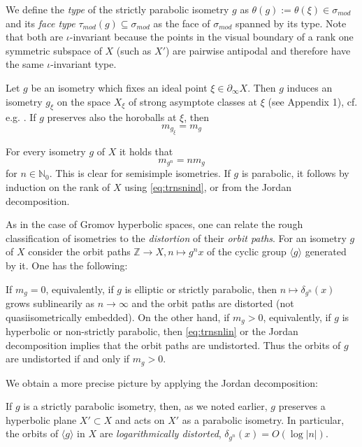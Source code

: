 \documentclass[12pt]{article}
\theoremstyle{boldplain}
\theoremstyle{bolddefinition}
\numberwithin{equation}{section}
\def\N{{\mathbb N}}
\def\Z{{\mathbb Z}}
\def\de{\delta}
\def\si{\sigma}
\def\geo{\partial_{\infty}}
\def\simod{\si_{mod}}
\def\taumod{\tau_{mod}}
\def\<{\langle}
\def\>{\rangle}
\begin{document}
We define the {\em type} of the strictly parabolic isometry $g$ as $\theta(g):=\theta(\xi)\in\simod$
and its {\em face type} $\taumod(g)\subseteq\simod$ as the face of $\simod$ spanned by its type.
Note that both are $\iota$-invariant because the points in the visual boundary of a rank one symmetric subspace of $X$ (such as $X'$)
are pairwise antipodal and therefore have the same $\iota$-invariant type.




\medskip
Let $g$ be an isometry which fixes an ideal point $\xi\in\geo X$.
Then $g$ induces an isometry $g_{\xi}$ on the space $X_{\xi}$ of strong asymptote classes at $\xi$ ({see Appendix 1}), 
cf. e.g. \cite{habil,bordif}.
If $g$ preserves also the horoballs at $\xi$, then 
\begin{equation}
\label{eq:trnsnind}
m_{g_{\xi}}=m_g
\end{equation}

For every isometry $g$ of $X$ it holds that 
\begin{equation}
\label{eq:trnsnlin}
m_{g^n}=n m_g
\end{equation}
for $n\in\N_0$.
This is clear for semisimple isometries.
If $g$ is parabolic,
it follows by induction on the rank of $X$ using \eqref{eq:trnsnind},
or from the Jordan decomposition. 

\medskip 
As in the case of Gromov hyperbolic spaces,
one can relate the rough classification of isometries to the {\em distortion} of their {\em orbit paths}.
For an isometry $g$ of $X$ consider the orbit paths $\Z\to X,n\mapsto g^nx$ of the cyclic group $\<g\>$ generated by it.
One has the following:

If $m_g=0$, equivalently, if $g$ is elliptic or strictly parabolic,
then $n\mapsto\de_{g^n}(x)$ grows sublinearily as $n\to\infty$
and the orbit paths are distorted (not quasiisometrically embedded).
On the other hand,
if $m_g>0$, equivalently, if $g$ is hyperbolic or non-strictly parabolic,
then \eqref{eq:trnsnlin} or the Jordan decomposition implies 
that the orbit paths 
are undistorted.
Thus the orbits of $g$ are undistorted if and only if $m_g>0$.

We obtain a more precise picture by applying the Jordan decomposition:

If $g$ is a strictly parabolic isometry, 
then, as we noted earlier, $g$ preserves a hyperbolic plane $X'\subset X$ and acts on $X'$ as a parabolic isometry. 
In particular,
the orbits of $\<g\>$ in $X$ are {\em logarithmically distorted},
$\de_{g^n}(x)=O(\log |n|)$. 
\end{document}
